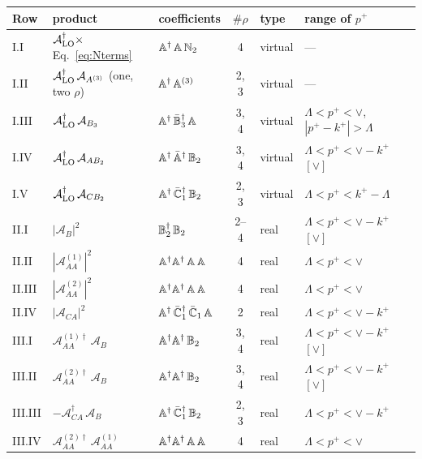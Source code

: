 \begin{table}[t]
\centering
\renewcommand{\arraystretch}{1.25}
\footnotesize
\begin{tabular}{@{}l l l c l l@{}}
\toprule
Row & product & coefficients & $\#\rho$ & type & range of $p^+$\\
\midrule
I.I & $\mathcal A_{\rm LO}^\dagger\times$ Eq.~\eqref{eq:Nterms} & $\mathbb{A}^\dagger\,\mathbb{A}\,\mathbb{N}_2$ & 4 & virtual & ---\\
I.II & $\mathcal A_{\rm LO}^\dagger\,\mathcal A_{A^{(3)}}$ (one, two $\rho$) & $\mathbb{A}^\dagger\,\mathbb{A}^{(3)}$ & 2, 3 & virtual & ---\\
I.III & $\mathcal A_{\rm LO}^\dagger\,\mathcal A_{B_3}$ & $\mathbb{A}^\dagger\,\bar{\mathbb{B}}_3^\dagger\,\mathbb{A}$ & 3, 4 & virtual & $\Lambda<p^+<\vee$, $|p^+-k^+|>\Lambda$\\
I.IV & $\mathcal A_{\rm LO}^\dagger\,\mathcal A_{AB_2}$ & $\mathbb{A}^\dagger\,\bar{\mathbb{A}}^\dagger\,\mathbb{B}_2$ & 3, 4 & virtual & $\Lambda<p^+<\vee-k^+$ $[\vee]$\\
I.V & $\mathcal A_{\rm LO}^\dagger\,\mathcal A_{CB_2}$ & $\mathbb{A}^\dagger\,\bar{\mathbb{C}}_1^\dagger\,\mathbb{B}_2$ & 2, 3 & virtual & $\Lambda<p^+<k^+-\Lambda$\\
\midrule
II.I & $|\mathcal A_B|^2$ & $\mathbb{B}_2^\dagger\,\mathbb{B}_2$ & 2--4 & real & $\Lambda<p^+<\vee-k^+$ $[\vee]$\\
II.II & $|\mathcal A^{(1)}_{AA}|^2$ & $\mathbb{A}^\dagger\mathbb{A}^\dagger\,\mathbb{A}\,\mathbb{A}$ & 4 & real & $\Lambda<p^+<\vee$\\
II.III & $|\mathcal A^{(2)}_{AA}|^2$ & $\mathbb{A}^\dagger\mathbb{A}^\dagger\,\mathbb{A}\,\mathbb{A}$ & 4 & real & $\Lambda<p^+<\vee$\\
II.IV & $|\mathcal A_{CA}|^2$ & $\mathbb{A}^\dagger\,\bar{\mathbb{C}}_1^\dagger\,\bar{\mathbb{C}}_1\,\mathbb{A}$ & 2 & real & $\Lambda<p^+<\vee-k^+$\\
\midrule
III.I & $\mathcal A^{(1)\dagger}_{AA}\,\mathcal A_B$ & $\mathbb{A}^\dagger\mathbb{A}^\dagger\,\mathbb{B}_2$ & 3, 4 & real & $\Lambda<p^+<\vee-k^+$ $[\vee]$\\
III.II & $\mathcal A^{(2)\dagger}_{AA}\,\mathcal A_B$ & $\mathbb{A}^\dagger\mathbb{A}^\dagger\,\mathbb{B}_2$ & 3, 4 & real & $\Lambda<p^+<\vee-k^+$ $[\vee]$\\
III.III & $-\mathcal A^{\dagger}_{CA}\,\mathcal A_B$ & $\mathbb{A}^\dagger\,\bar{\mathbb{C}}_1^\dagger\,\mathbb{B}_2$ & 2, 3 & real & $\Lambda<p^+<\vee-k^+$\\
III.IV & $\mathcal A^{(2)\dagger}_{AA}\,\mathcal A^{(1)}_{AA}$ & $\mathbb{A}^\dagger\mathbb{A}^\dagger\,\mathbb{A}\,\mathbb{A}$ & 4 & real & $\Lambda<p^+<\vee$\\

\end{tabular}
\end{table}
